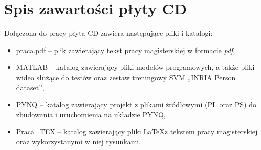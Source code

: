 \renewcommand{\thechapter}{\Alph{chapter}}
\chapter{Spis zawartości płyty CD}

Dołączona do pracy płyta CD zawiera następujące pliki i katalogi:
\begin{itemize}
	\item praca.pdf -- plik zawierający tekst pracy magisterskiej w formacie \textit{pdf},
	\item MATLAB -- katalog zawierający pliki modelów programowych, a także pliki wideo służące do testów oraz zestaw treningowy SVM „INRIA Person dataset”,
	\item PYNQ -- katalog zawierający projekt z plikami źródłowymi (PL oraz PS) do zbudowania i uruchomienia na układzie PYNQ,
	\item Praca\_TEX -- katalog zawierający pliki \LaTeX z tekstem pracy magisterskiej oraz wykorzystanymi w niej rysunkami.
\end{itemize}